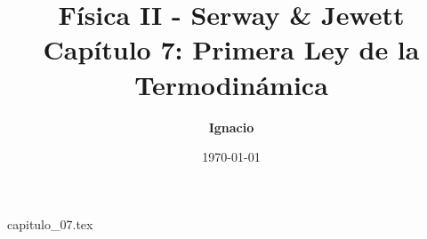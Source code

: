 \documentclass[11pt,spanish,oneside]{report}
\title{\textbf{Física II - Serway \& Jewett} \\ \Large Capítulo 7: Primera Ley de la Termodinámica}
\author{\textbf{Ignacio}}
\date{\today}
\begin{document}
\maketitle

{capitulo_07.tex}
\end{document}
